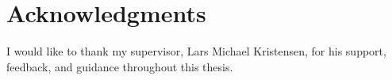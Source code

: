 \chapter*{Acknowledgments}

I would like to thank my supervisor, Lars Michael Kristensen, for his support, feedback, and guidance throughout this thesis.